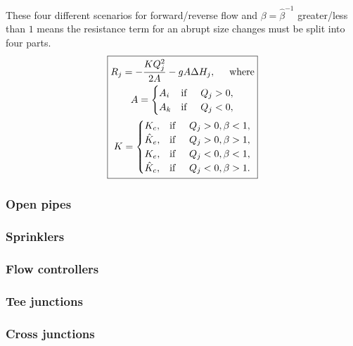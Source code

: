 \documentclass[12pt]{article}
\begin{document}
These four different scenarios for forward/reverse flow and $\beta = \hat{\beta}^{-1}$ greater/less than $1$ means the resistance term for an abrupt size changes must be split into four parts. 
{\color{green}
\begin{align}\label{abrupt_size_change_resistance}
\boxed{
  \!\begin{gathered}
  R_j = -\frac{K Q_j^2}{2 A} - g A \Delta H_j, \hspace{0.5cm} \text{where} \\
A = \begin{cases}
A_i &\text{if} \hspace{0.5cm} Q_j > 0,\\
A_k &\text{if} \hspace{0.5cm} Q_j < 0,
\end{cases} \nonumber \\
K = \begin{cases} 
K_c, &\text{if} \hspace{0.5cm} Q_j > 0, \beta < 1, \\
\hat{K}_e, &\text{if} \hspace{0.5cm} Q_j > 0, \beta > 1, \\
K_e, &\text{if} \hspace{0.5cm} Q_j < 0, \beta < 1, \\
\hat{K}_c, &\text{if} \hspace{0.5cm} Q_j < 0, \beta > 1.
\end{cases} \nonumber
  \end{gathered}
}
\end{align}
}

\subsubsection{Open pipes}

\subsubsection{Sprinklers}

\subsubsection{Flow controllers}

\subsubsection{Tee junctions}

\subsubsection{Cross junctions}
\end{document}
